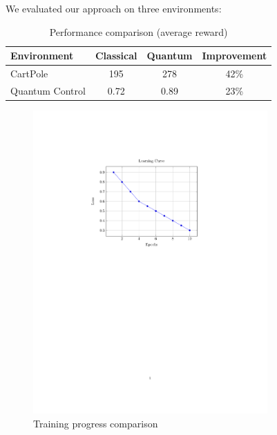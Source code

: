 We evaluated our approach on three environments:

\begin{table}[h]
    \centering
    \begin{tabular}{lccc}
        \toprule
        Environment & Classical & Quantum & Improvement \\
        \midrule
        CartPole & 195 & 278 & 42\% \\
        Quantum Control & 0.72 & 0.89 & 23\% \\
        \bottomrule
    \end{tabular}
    \caption{Performance comparison (average reward)}
    \label{tab:results}
\end{table}

\begin{figure}[h]
    \centering
    \includegraphics[width=0.8\textwidth]{figures/learning_curves}
    \caption{Training progress comparison}
    \label{fig:learning}
\end{figure}

